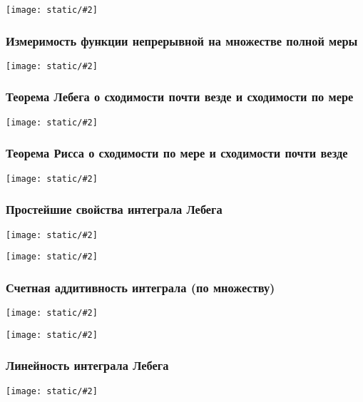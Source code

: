 \documentclass{article}
\def\images#1#2{\begin{center}\texttt{[image: static/\#2]}\end{center}}
\begin{document}
\images{0.95}{iz_sup.jpg}

\subsubsection{Измеримость функции непрерывной на множестве полной меры}

\images{0.95}{iz_mn_mer_0.jpg}

\subsubsection{Теорема Лебега о сходимости почти везде и сходимости по мере}

\images{0.95}{teor_leb.jpg}

\subsubsection{Теорема Рисса о сходимости по мере и сходимости почти везде}

\images{0.95}{teor_rissa.jpg}

\subsubsection{Простейшие свойства интеграла Лебега}

\images{0.95}{pr_sv_int_leb_1.jpg}

\images{0.95}{pr_sv_int_leb_2.jpg}

\subsubsection{Счетная аддитивность интеграла (по множеству)}

\images{0.95}{sch_add_1.jpg}

\images{0.95}{sch_add_2.jpg}

\subsubsection{Линейность интеграла Лебега}

\images{0.95}{lin_int_leb.jpg}

\newpage 
\end{document}
